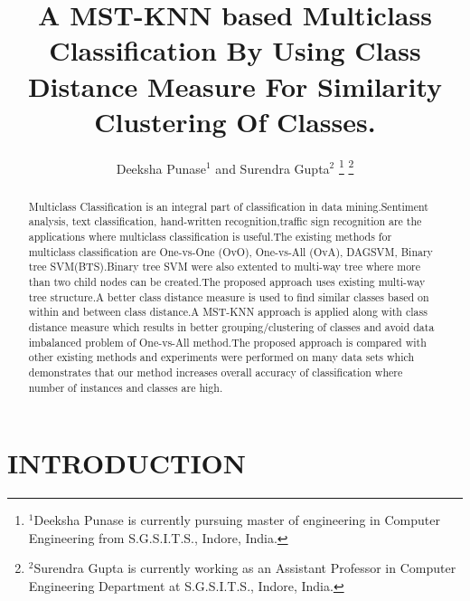 \documentclass[a4paper, 10pt, conference]{ieeeconf}      %
\title{\LARGE \bf
A MST-KNN based Multiclass Classification By Using Class Distance Measure For Similarity Clustering Of Classes.}
\author{Deeksha Punase$^{1}$ and Surendra Gupta$^{2}$%
\thanks{$^{1}$Deeksha Punase is currently pursuing master of engineering in Computer Engineering from S.G.S.I.T.S., Indore, India.}%
\thanks{$^{2}$Surendra Gupta is currently working as an Assistant Professor in Computer Engineering Department at S.G.S.I.T.S., Indore, India.}%
}
\begin{document}
\maketitle
\thispagestyle{empty}
\pagestyle{empty}


\begin{abstract}
Multiclass Classification is an integral part of classification in data mining.Sentiment analysis, text classification, hand-written recognition,traffic sign recognition are the applications where multiclass classification is useful.The existing methods for multiclass classification are One-vs-One (OvO), One-vs-All (OvA), DAGSVM, Binary tree SVM(BTS).Binary tree SVM were also extented to multi-way tree where more than two child nodes can be created.The proposed approach uses existing multi-way tree structure.A better class distance measure is used to find similar classes based on within and between class distance.A MST-KNN approach is applied along with class distance measure which results in better grouping/clustering of classes and avoid data imbalanced problem of One-vs-All method.The proposed approach is compared with other existing methods and experiments were performed on many data sets which demonstrates that our method increases overall accuracy of classification where number of instances and classes are high. 
\end{abstract}


\section{INTRODUCTION}
\end{document}
